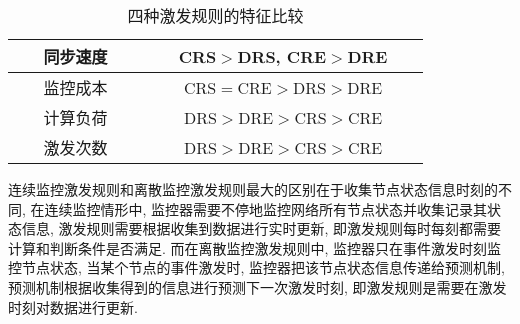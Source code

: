 \begin{table}[!hbp]
\setlength{\abovecaptionskip}{-1pt}
\setlength{\belowcaptionskip}{-1pt}
\caption{四种激发规则的特征比较}\label{table11}
\begin{center}
\begin{tabular}{|c|c|}
\hline
~~~同步速度~~~ & ~~~CRS$>$DRS, CRE$>$DRE~~~\\
\hline
~~~监控成本~~~ & ~~~CRS$=$CRE$>$DRS$>$DRE~~~\\
\hline
~~~计算负荷~~~ & ~~~DRS$>$DRE$>$CRS$>$CRE~~~\\
\hline
~~~激发次数~~~ & ~~~DRS$>$DRE$>$CRS$>$CRE~~~\\
\hline
\end{tabular}
\end{center}
\end{table}
        \begin{rem}
        连续监控激发规则和离散监控激发规则最大的区别在于收集节点状态信息时刻的不同, 在连续监控情形中, 监控器需要不停地监控网络所有节点状态并收集记录其状态信息, 激发规则需要根据收集到数据进行实时更新, 即激发规则每时每刻都需要计算和判断条件是否满足. 而在离散监控激发规则中, 监控器只在事件激发时刻监控节点状态, 当某个节点的事件激发时, 监控器把该节点状态信息传递给预测机制, 预测机制根据收集得到的信息进行预测下一次激发时刻, 即激发规则是需要在激发时刻对数据进行更新.
        \end{rem}

